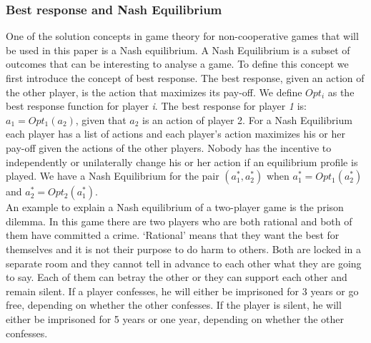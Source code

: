 \subsubsection{Best response and Nash Equilibrium}
One of the solution concepts in game theory for non-cooperative games that will be used in this paper is a Nash equilibrium. A Nash Equilibrium is a subset of outcomes that can be interesting to analyse a game. To define this concept we first introduce the concept of best response. The best response, given an action of the other player, is the action that maximizes its pay-off.  We define $Opt_{i}$ as the best response function for player \textit{i}. The best response for player \textit{1} is: $a_{1} = Opt_{1}(a_{2})$, given that $a_{2}$ is an action of player 2. For a Nash Equilibrium each player has a list of actions and each player's action maximizes his or her pay-off given the actions of the other players. Nobody has the incentive to independently or unilaterally change his or her action if an equilibrium profile is played. We have a Nash Equilibrium for the pair $(a_{1}^{*},a_{2}^{*})$ when $a_{1}^{*} = Opt_{1}(a_{2}^{*})$ and $a_{2}^{*} = Opt_{2}(a_{1}^{*})$.\\


An example to explain a Nash equilibrium of a two-player game is the prison dilemma. In this game there are two players who are both rational and both of them have committed a crime. `Rational' means that they want the best for themselves and it is not their purpose to do harm to others. Both are locked in a separate room and they cannot tell in advance to each other what they are going to say. Each of them can betray the other or they can support each other and remain silent. If a player confesses, he will either be imprisoned for 3 years or go free, depending on whether the other confesses. If the player is silent, he will either be imprisoned for 5 years or one year, depending on whether the other confesses.  \\ 

